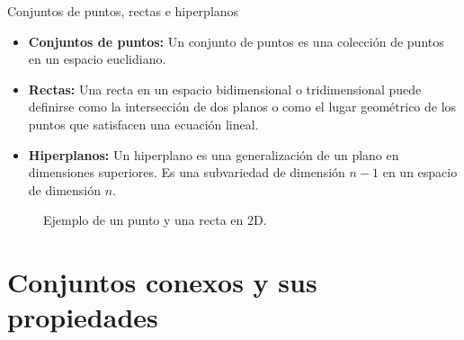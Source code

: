 \documentclass{beamer}
\begin{document}
\begin{frame}{Conjuntos de puntos, rectas e hiperplanos}
    \begin{itemize}
        \item \textbf{Conjuntos de puntos:} Un conjunto de puntos es una colección de puntos en un espacio euclidiano.
        \item \textbf{Rectas:} Una recta en un espacio bidimensional o tridimensional puede definirse como la intersección de dos planos o como el lugar geométrico de los puntos que satisfacen una ecuación lineal.
        \item \textbf{Hiperplanos:} Un hiperplano es una generalización de un plano en dimensiones superiores. Es una subvariedad de dimensión \(n-1\) en un espacio de dimensión \(n\).
    \end{itemize}
    
    \begin{figure}
        \centering
        \caption{Ejemplo de un punto y una recta en 2D.}
    \end{figure}
\end{frame}

\section{Conjuntos conexos y sus propiedades}
\end{document}
